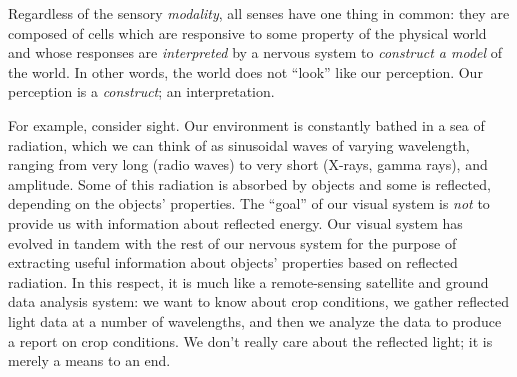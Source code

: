Regardless of the sensory \emph{modality}, all senses have one thing
in common: they are composed of cells which are responsive to some
property of the physical world and whose responses are
\emph{interpreted} by a nervous system to \emph{construct a model} of
the world. In other words, the world does not ``look'' like our
perception.  Our perception is a \emph{construct}; an interpretation.

For example, consider sight. Our environment is constantly bathed in a
sea of radiation, which we can think of as sinusoidal waves of varying
wavelength, ranging from very long (radio waves) to very short
(X-rays, gamma rays), and amplitude.  Some of this radiation is
absorbed by objects and some is reflected, depending on the objects'
properties.  The ``goal'' of our visual system is \emph{not} to
provide us with information about reflected energy.  Our visual system
has evolved in tandem with the rest of our nervous system for the
purpose of extracting useful information about objects' properties
based on reflected radiation.  In this respect, it is much like a
remote-sensing satellite and ground data analysis system: we want to
know about crop conditions, we gather reflected light data at a number
of wavelengths, and then we analyze the data to produce a report on
crop conditions. We don't really care about the reflected light; it is
merely a means to an end.
\end{window}

